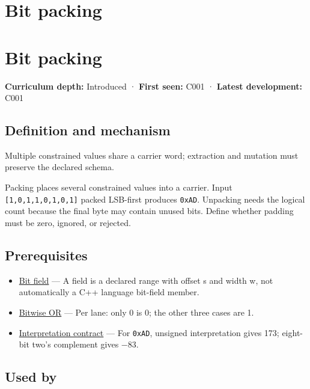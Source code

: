 \hypertarget{appendix-1f9963e1a5d1}{}
\section*{Bit packing}
\section{Bit packing}\label{appendix-1f9963e1a5d1-bit-packing}

\textbf{Curriculum depth:} Introduced · \textbf{First seen:} C001 · \textbf{Latest development:} C001

\subsection{Definition and mechanism}\label{appendix-1f9963e1a5d1-definition-and-mechanism}

Multiple constrained values share a carrier word; extraction and mutation must preserve the declared schema.

Packing places several constrained values into a carrier. Input \texttt{{[}1,0,1,1,0,1,0,1{]}} packed LSB-first produces \texttt{0xAD}. Unpacking needs the logical count because the final byte may contain unused bits. Define whether padding must be zero, ignored, or rejected.

\subsection{Prerequisites}\label{appendix-1f9963e1a5d1-prerequisites}

\begin{itemize}
\tightlist
\item
  \hyperref[appendix-ac697f5c66e8]{Bit field} --- A field is a declared range with offset s and width w, not automatically a C++ language bit-field member.
\item
  \hyperref[appendix-a427ce8ce8a6]{Bitwise OR} --- Per lane: only 0 is 0; the other three cases are 1.
\item
  \hyperref[appendix-f414bd4ed05c]{Interpretation contract} --- For \texttt{0xAD}, unsigned interpretation gives 173; eight-bit two's complement gives −83.
\end{itemize}

\subsection{Used by}\label{appendix-1f9963e1a5d1-used-by}

